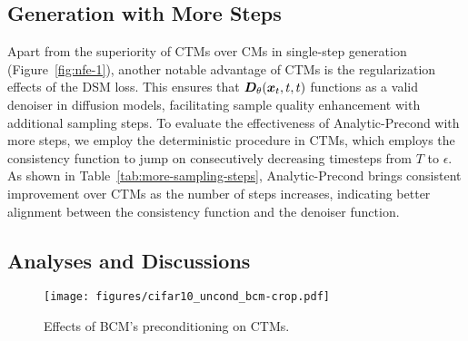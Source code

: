 \subsection{Generation with More Steps}
\begin{table}[t]
      \centering
    \caption{\label{tab:more-sampling-steps} FID results in multi-step generation with different number of function evaluations (NFEs).}
    \vskip 0.1in
    \vspace{-0.1in}
\end{table}
Apart from the superiority of CTMs over CMs in single-step generation (Figure~\ref{fig:nfe-1}), another notable advantage of CTMs is the regularization effects of the DSM loss. This ensures that $\bm{D}_\theta(\bm{x}_t,t,t)$ functions as a valid denoiser in diffusion models, facilitating sample quality enhancement with additional sampling steps. To evaluate the effectiveness of Analytic-Precond with more steps, we employ the deterministic procedure in CTMs, which employs the consistency function to jump on consecutively decreasing timesteps from $T$ to $\epsilon$. As shown in Table~\ref{tab:more-sampling-steps}, Analytic-Precond brings consistent improvement over CTMs as the number of steps increases, indicating better alignment between the consistency function and the denoiser function.
\subsection{Analyses and Discussions}
\begin{wrapfigure}[9]{r}{0.3\textwidth}
\vspace{-0.6in}
\texttt{[image: figures/cifar10\_uncond\_bcm-crop.pdf]}
\caption{\label{fig:bcm}\small{Effects of BCM's preconditioning on CTMs.}}
\end{wrapfigure}

